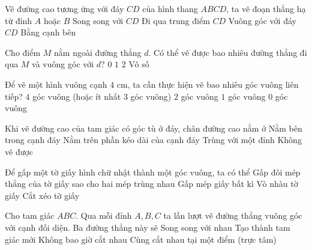\begin{ex} %
Vẽ đường cao tương ứng với đáy $CD$ của hình thang $ABCD$, ta vẽ đoạn thẳng hạ từ đỉnh $A$ hoặc $B$
\choice
{Song song với $CD$}
{Đi qua trung điểm $CD$}
{\True Vuông góc với đáy $CD$}
{Bằng cạnh bên}
\end{ex}

\begin{ex} %
Cho điểm $M$ nằm ngoài đường thẳng $d$. Có thể vẽ được bao nhiêu đường thẳng đi qua $M$ và vuông góc với $d$?
\choice
{$0$}
{\True $1$}
{$2$}
{Vô số}
\end{ex}

\begin{ex} %
Để vẽ một hình vuông cạnh $4\text{ cm}$, ta cần thực hiện vẽ bao nhiêu góc vuông liên tiếp?
\choice
{\True $4$ góc vuông (hoặc ít nhất 3 góc vuông)}
{$2$ góc vuông}
{$1$ góc vuông}
{$0$ góc vuông}
\end{ex}

\begin{ex} %
Khi vẽ đường cao của tam giác có góc tù ở đáy, chân đường cao nằm ở
\choice
{Nằm bên trong cạnh đáy}
{\True Nằm trên phần kéo dài của cạnh đáy}
{Trùng với một đỉnh}
{Không vẽ được}
\end{ex}

\begin{ex} %
Để gấp một tờ giấy hình chữ nhật thành một góc vuông, ta có thể
\choice
{\True Gấp đôi mép thẳng của tờ giấy sao cho hai mép trùng nhau}
{Gấp mép giấy bất kì}
{Vò nhàu tờ giấy}
{Cắt xéo tờ giấy}
\end{ex}

\begin{ex} %
Cho tam giác $ABC$. Qua mỗi đỉnh $A, B, C$ ta lần lượt vẽ đường thẳng vuông góc với cạnh đối diện. Ba đường thẳng này sẽ
\choice
{Song song với nhau}
{Tạo thành tam giác mới}
{Không bao giờ cắt nhau}
{\True Cùng cắt nhau tại một điểm (trực tâm)}
\end{ex}

